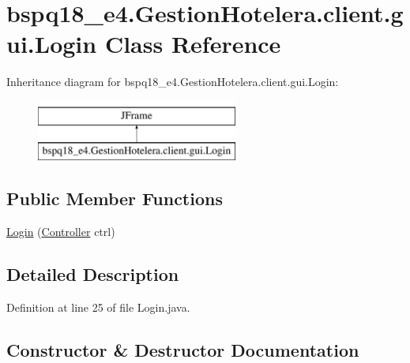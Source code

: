 \hypertarget{classbspq18__e4_1_1_gestion_hotelera_1_1client_1_1gui_1_1_login}{}\section{bspq18\+\_\+e4.\+Gestion\+Hotelera.\+client.\+gui.\+Login Class Reference}
\label{classbspq18__e4_1_1_gestion_hotelera_1_1client_1_1gui_1_1_login}
Inheritance diagram for bspq18\+\_\+e4.\+Gestion\+Hotelera.\+client.\+gui.\+Login\+:\begin{figure}[H]
\begin{center}
\leavevmode
\includegraphics[height=2.000000cm]{classbspq18__e4_1_1_gestion_hotelera_1_1client_1_1gui_1_1_login}
\end{center}
\end{figure}
\subsection*{Public Member Functions}
\begin{DoxyCompactItemize}
\item 
\mbox{\hyperlink{classbspq18__e4_1_1_gestion_hotelera_1_1client_1_1gui_1_1_login_a05d97ff0a86c03051bdfaff46506ec09}{Login}} (\mbox{\hyperlink{classbspq18__e4_1_1_gestion_hotelera_1_1client_1_1controller_1_1_controller}{Controller}} ctrl)
\end{DoxyCompactItemize}


\subsection{Detailed Description}


Definition at line 25 of file Login.\+java.



\subsection{Constructor \& Destructor Documentation}
\mbox{\label{classbspq18__e4_1_1_gestion_hotelera_1_1client_1_1gui_1_1_login_a05d97ff0a86c03051bdfaff46506ec09}} 
